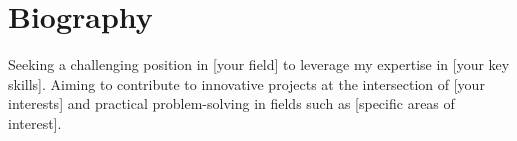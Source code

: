 \section{Biography}
{\small
Seeking a challenging position in [your field] to leverage my expertise in [your key skills]. Aiming to contribute to innovative projects at the intersection of [your interests] and practical problem-solving in fields such as [specific areas of interest].
}%